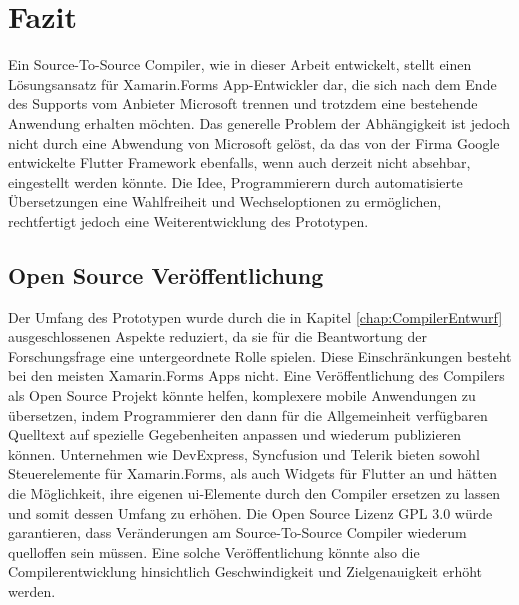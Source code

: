 \chapter{Fazit}
\label{chap:FazitAusblick}
Ein Source-To-Source Compiler,  wie in dieser Arbeit entwickelt, stellt einen Lösungsansatz für Xamarin.Forms App-Entwickler dar,  die sich nach dem Ende des Supports vom Anbieter Microsoft trennen und trotzdem eine bestehende Anwendung erhalten möchten.  Das generelle Problem der Abhängigkeit ist jedoch nicht durch eine Abwendung von Microsoft gelöst, da das von der Firma Google entwickelte Flutter Framework ebenfalls, wenn auch derzeit nicht absehbar,  eingestellt werden könnte.  Die Idee,  Programmierern durch automatisierte Übersetzungen eine Wahlfreiheit und Wechseloptionen zu ermöglichen, rechtfertigt jedoch eine Weiterentwicklung des Prototypen.

\section{Open Source Veröffentlichung}

Der Umfang des Prototypen wurde durch die in Kapitel \ref{chap:CompilerEntwurf} ausgeschlossenen Aspekte reduziert,  da sie für die Beantwortung der Forschungsfrage eine untergeordnete Rolle spielen.  Diese Einschränkungen besteht bei den meisten Xamarin.Forms Apps nicht.  Eine Veröffentlichung des Compilers als Open Source Projekt könnte helfen,  komplexere mobile Anwendungen zu übersetzen,  indem Programmierer den dann für die Allgemeinheit verfügbaren Quelltext auf spezielle Gegebenheiten anpassen und wiederum publizieren können.  Unternehmen wie DevExpress,  Syncfusion und Telerik bieten sowohl Steuerelemente für 
Xamarin.Forms,  als auch Widgets für Flutter an und hätten die Möglichkeit,  ihre eigenen \ac{ui}-Elemente 
durch den Compiler ersetzen zu lassen und somit dessen Umfang zu erhöhen.  Die Open Source Lizenz GPL 3.0 würde garantieren,  dass Veränderungen am Source-To-Source Compiler wiederum quelloffen sein müssen.  Eine solche Veröffentlichung könnte also die Compilerentwicklung hinsichtlich Geschwindigkeit und Zielgenauigkeit erhöht werden.

